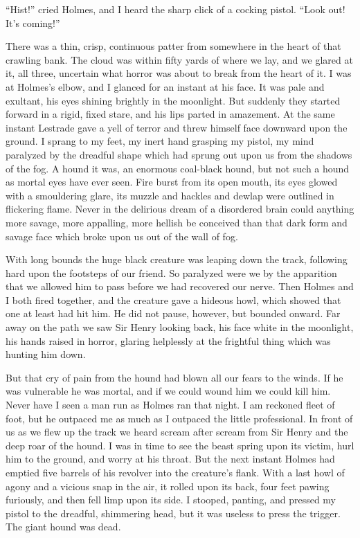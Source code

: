 \documentclass[paper=a5,BCOR=7mm,twoside,DIV=calc,12pt,usegeometry,openany,chapterprefix,endperiod,headings=big]{scrbook} %
\begin{document}
\enquote{Hist!} cried Holmes, and I heard the sharp click of a cocking pistol. \enquote{Look out! It's coming!}

There was a thin, crisp, continuous patter from somewhere in the heart of that crawling bank. The cloud was within fifty yards of where we lay, and we glared at it, all three, uncertain what horror was about to break from the heart of it. I was at Holmes's elbow, and I glanced for an instant at his face. It was pale and exultant, his eyes shining brightly in the moonlight. But suddenly they started forward in a rigid, fixed stare, and his lips parted in amazement. At the same instant Lestrade gave a yell of terror and threw himself face downward upon the ground. I sprang to my feet, my inert hand grasping my pistol, my mind paralyzed by the dreadful shape which had sprung out upon us from the shadows of the fog. A hound it was, an enormous coal-black hound, but not such a hound as mortal eyes have ever seen. Fire burst from its open mouth, its eyes glowed with a smouldering glare, its muzzle and hackles and dewlap were outlined in flickering flame. Never in the delirious dream of a disordered brain could anything more savage, more appalling, more hellish be conceived than that dark form and savage face which broke upon us out of the wall of fog.

With long bounds the huge black creature was leaping down the track, following hard upon the footsteps of our friend. So paralyzed were we by the apparition that we allowed him to pass before we had recovered our nerve. Then Holmes and I both fired together, and the creature gave a hideous howl, which showed that one at least had hit him. He did not pause, however, but bounded onward. Far away on the path we saw Sir Henry looking back, his face white in the moonlight, his hands raised in horror, glaring helplessly at the frightful thing which was hunting him down.

But that cry of pain from the hound had blown all our fears to the winds. If he was vulnerable he was mortal, and if we could wound him we could kill him. Never have I seen a man run as Holmes ran that night. I am reckoned fleet of foot, but he outpaced me as much as I outpaced the little professional. In front of us as we flew up the track we heard scream after scream from Sir Henry and the deep roar of the hound. I was in time to see the beast spring upon its victim, hurl him to the ground, and worry at his throat. But the next instant Holmes had emptied five barrels of his revolver into the creature's flank. With a last howl of agony and a vicious snap in the air, it rolled upon its back, four feet pawing furiously, and then fell limp upon its side. I stooped, panting, and pressed my pistol to the dreadful, shimmering head, but it was useless to press the trigger. The giant hound was dead.
\end{document}
